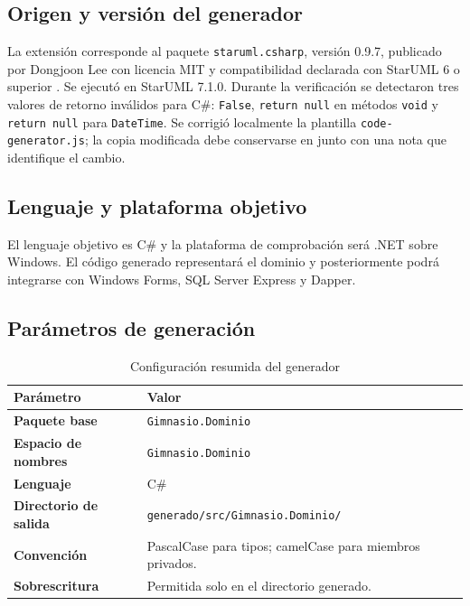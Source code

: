 \documentclass[12pt,a4paper]{article}
\begin{document}
\subsection{Origen y versión del generador}

La extensión corresponde al paquete \texttt{staruml.csharp}, versión 0.9.7,
publicado por Dongjoon Lee con licencia MIT y compatibilidad declarada con
StarUML 6 o superior \cite{starumlCSharp2025}. Se ejecutó en StarUML 7.1.0.
Durante la verificación se detectaron tres valores de retorno inválidos para
C\#: \texttt{False}, \texttt{return null} en métodos \texttt{void} y
\texttt{return null} para \texttt{DateTime}. Se corrigió localmente la plantilla
\texttt{code-generator.js}; la copia modificada debe conservarse en
 junto con una nota que identifique el cambio.

\subsection{Lenguaje y plataforma objetivo}

El lenguaje objetivo es C\# y la plataforma de comprobación será .NET sobre
Windows. El código generado representará el dominio y posteriormente podrá
integrarse con Windows Forms, SQL Server Express y Dapper.

\subsection{Parámetros de generación}

\begin{table}[htbp]
  \centering
  \caption{Configuración resumida del generador}
  \label{tab:configuracion-generador}
  \footnotesize
  \begin{tabularx}{\textwidth}{>{\bfseries}p{4cm}X}
    \toprule
    Parámetro & Valor \\
    \midrule
    Paquete base & \texttt{Gimnasio.Dominio} \\
    Espacio de nombres & \texttt{Gimnasio.Dominio} \\
    Lenguaje & C\# \\
    Directorio de salida & \texttt{generado/src/Gimnasio.Dominio/} \\
    Convención & PascalCase para tipos; camelCase para miembros privados. \\
    Sobrescritura & Permitida solo en el directorio generado. \\
    \bottomrule
  \end{tabularx}
\end{table}
\end{document}

